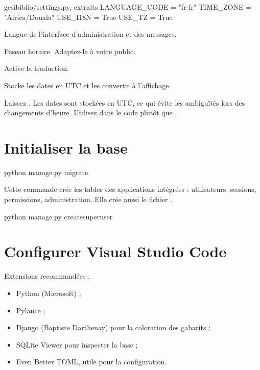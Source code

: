 \begin{codebox}[python]{gesibiblio/settings.py, extraits}
LANGUAGE_CODE = "fr-fr"
TIME_ZONE = "Africa/Douala"
USE_I18N = True
USE_TZ = True
\end{codebox}

\begin{description}[leftmargin=4.3cm,style=nextline]
  \item[\code{LANGUAGE\_CODE}] Langue de l'interface d'administration et des
  messages.
  \item[\code{TIME\_ZONE}] Fuseau horaire. Adaptez-le à votre public.
  \item[\code{USE\_I18N}] Active la traduction.
  \item[\code{USE\_TZ}] Stocke les dates en UTC et les convertit à l'affichage.
\end{description}

\begin{bonne}
Laissez . Les dates sont stockées en UTC, ce qui évite les
ambiguïtés lors des changements d'heure. Utilisez  dans
le code plutôt que .
\end{bonne}

\section{Initialiser la base}

\begin{terminal}
python manage.py migrate
\end{terminal}

Cette commande crée les tables des applications intégrées : utilisateurs, sessions,
permissions, administration. Elle crée aussi le fichier .

\begin{terminal}
python manage.py createsuperuser
\end{terminal}

\section{Configurer Visual Studio Code}

Extensions recommandées :
\begin{itemize}
  \item Python (Microsoft) ;
  \item Pylance ;
  \item Django (Baptiste Darthenay) pour la coloration des gabarits ;
  \item SQLite Viewer pour inspecter la base ;
  \item Even Better TOML, utile pour la configuration.
\end{itemize}

